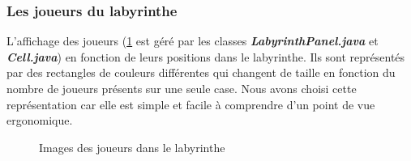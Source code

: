 \subsubsection*{Les joueurs du labyrinthe}

L'affichage des joueurs (\ref{fig:PlayersInLabyrinth} est géré par les classes \textbf{\textit{LabyrinthPanel.java}} et \textbf{\textit{Cell.java}}) en fonction de leurs positions dans le labyrinthe. Ils sont représentés par des rectangles de couleurs différentes qui changent de taille en fonction du nombre de joueurs présents sur une seule case. Nous avons choisi cette représentation car elle est simple et facile à comprendre d'un point de vue ergonomique.

\begin{figure}[!htb]
    \centering
    \qquad
    \qquad
    \qquad
    \qquad
    \caption{Images des joueurs dans le labyrinthe}
    \label{fig:PlayersInLabyrinth}
\end{figure}
\FloatBarrier

